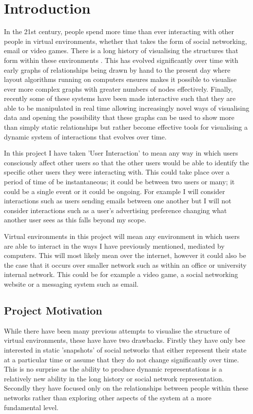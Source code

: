 \documentclass[12pt,a4paper]{article}
\begin{document}
\section{Introduction}

In the 21st century, people spend more time than ever interacting with other people in virtual environments, whether that takes the form of social networking, email or video games. There is a long history of visualising the structures that form within these environments \cite{freeman2000visualizing}. This has evolved significantly over time with early graphs of relationships being drawn by hand to the present day where layout algorithms running on computers ensures makes it possible to visualise ever more complex graphs with greater numbers of nodes effectively. Finally, recently some of these systems have been made interactive such that they are able to be manipulated in real time allowing increasingly novel ways of visualising data and opening the possibility that these graphs can be used to show more than simply static relationships but rather become effective tools for visualising a dynamic system of interactions that evolves over time.

In this project I have taken 'User Interaction' to mean any way in which users consciously affect other users so that the other users would be able to identify the specific other users they were interacting with. This could take place over a period of time of be instantaneous; it could be between two users or many; it could be a single event or it could be ongoing. For example I will consider interactions such as users sending emails between one another but I will not consider interactions such as a user's advertising preference changing what another user sees as this falls beyond my scope.

Virtual environments in this project will mean any environment in which users are able to interact in the ways I have previously mentioned, mediated by computers. This will most likely mean over the internet, however it could also be the case that it occurs over smaller network such as within an office or university internal network. This could be for example a video game, a social networking website or a messaging system such as email.

\subsection{Project Motivation}

While there have been many previous attempts to visualise the structure of virtual environments, these have have two drawbacks. Firstly they have only bee interested in static 'snapshots' of social networks that either represent their state at a particular time or assume that they do not change significantly over time. This is no surprise as the ability to produce dynamic representations is a relatively new ability in the long history or social network representation. Secondly they have focused only on the relationships between people within these networks rather than exploring other aspects of the system at a more fundamental level.
\end{document}
